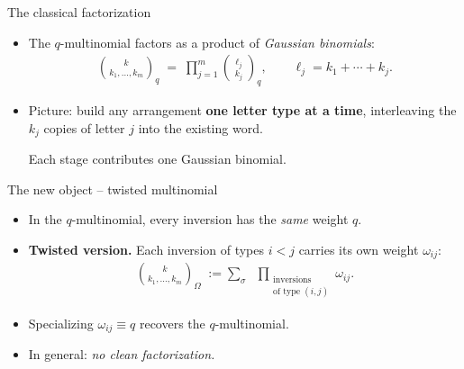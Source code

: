 \documentclass{beamer}
\renewcommand{\>}{\rangle}
\newcommand{\<}{\langle}
\begin{document}

\begin{frame}{The classical factorization}

\begin{itemize}
    \item The $q$-multinomial factors as a product of \emph{Gaussian
    binomials}:
    \begin{align*}
        \binom{k}{k_1,\ldots,k_m}_q
        \;=\;
        \prod_{j=1}^m \binom{\ell_j}{k_j}_q,
        \qquad
        \ell_j = k_1 + \cdots + k_j.
    \end{align*}

    \bigskip
    \item Picture: build any arrangement \textbf{one letter type at a
    time}, interleaving the $k_j$ copies of letter $j$ into the existing word.

    \medskip
    Each stage contributes one Gaussian binomial.
\end{itemize}
\end{frame}


\begin{frame}{The new object -- twisted multinomial}

\begin{itemize}
    \item In the $q$-multinomial, every inversion has the \emph{same}
    weight $q$.

    \bigskip
    \item \textbf{Twisted version.} Each inversion of types $i<j$ carries
    its own weight $\omega_{ij}$:
    \begin{align*}
        \binom{k}{k_1,\dots,k_m}_\Omega
        \;:=\!
        \sum_{\sigma}\;\;
        \prod_{\substack{\text{inversions}\\\text{of type }(i,j)}}
        \omega_{ij}.
    \end{align*}

    \bigskip
    \item Specializing $\omega_{ij}\equiv q$ recovers the $q$-multinomial.

    \medskip
    \item In general: \emph{no clean factorization.}
\end{itemize}
\end{frame}

\end{document}

